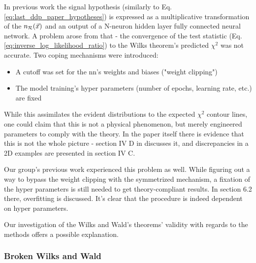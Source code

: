 \documentclass[paper/ddppaper2.tex]{subfiles}
\begin{document}
\iftoggle{ispaper}{
    \section{Convergence of Training}
}{
    \subsection{Convergence of Training}
}
\label{sec:broken_Wilks_Wald}

In previous work \cite{Italian_no_1_Learning_New_Physics_from_a_Machine, Italian_no_2_Learning_New_Physics_from_an_Imperfect_Machine} the signal hypothesis (similarly to Eq. \ref{eq:last_ddp_paper_hypotheses}) is expressed as a multiplicative transformation of the $n_{\mathcal{R}}({\vec{{x}}})$ and an output of a N-neuron hidden layer fully connected neural network.
A problem arose from that - the convergence of the test statistic (Eq. \ref{eq:inverse_log_likelihood_ratio}) to the Wilks theorem's predicted $\chi^2$ was not accurate. Two coping mechanisms were introduced:
\begin{itemize}
    \item A cutoff was set for the \gls{nn}'s weights and biases ("weight clipping")
    \item The model training's hyper parameters (number of epochs, learning rate, etc.) are fixed
\end{itemize}

While this assimilates the evident distributions to the expected $\chi^2$ contour lines, one could claim that this is not a physical phenomenon, but merely engineered parameters to comply with the theory. In the paper itself there is evidence that this is not the whole picture - section IV D in \cite{Italian_no_1_Learning_New_Physics_from_a_Machine} discusses it, and discrepancies in a 2D examples are presented in section IV C.

Our group's previous work \cite{LastDDPPaper} experienced this problem as well. While figuring out a way to bypass the weight clipping with the symmetrized mechanism, a fixation of the hyper parameters is still needed to get theory-compliant results. In section 6.2 there, overfitting is discussed. It's clear that the procedure is indeed dependent on hyper parameters.

Our investigation of the Wilks and Wald's theorems' validity with regards to the methods offers a possible explanation.

\subsubsection{Broken Wilks and Wald}
\end{document}
